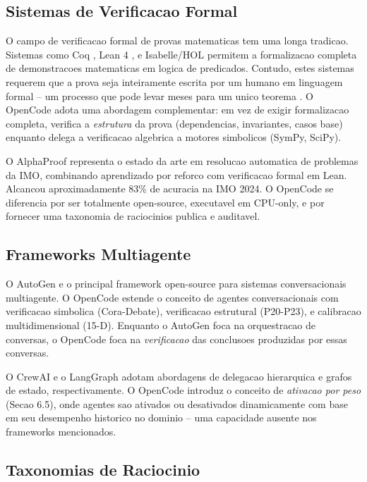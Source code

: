 \documentclass[5p]{elsarticle}
\begin{document}
\subsection{Sistemas de Verificacao Formal}

O campo de verificacao formal de provas matematicas tem uma longa tradicao.
Sistemas como Coq \cite{bertot2004}, Lean 4 \cite{demoura2021}, e Isabelle/HOL
permitem a formalizacao completa de demonstracoes matematicas em logica de
predicados. Contudo, estes sistemas requerem que a prova seja inteiramente
escrita por um humano em linguagem formal -- um processo que pode levar meses
para um unico teorema \cite{bertot2004}. O OpenCode adota uma abordagem
complementar: em vez de exigir formalizacao completa, verifica a \textit{estrutura}
da prova (dependencias, invariantes, casos base) enquanto delega a verificacao
algebrica a motores simbolicos (SymPy, SciPy).

O AlphaProof \cite{deepmind2025} representa o estado da arte em resolucao
automatica de problemas da IMO, combinando aprendizado por reforco com
verificacao formal em Lean. Alcancou aproximadamente 83\% de acuracia na
IMO 2024. O OpenCode se diferencia por ser totalmente open-source, executavel
em CPU-only, e por fornecer uma taxonomia de raciocinios publica e auditavel.

\subsection{Frameworks Multiagente}

O AutoGen \cite{wu2023} e o principal framework open-source para sistemas
conversacionais multiagente. O OpenCode estende o conceito de agentes
conversacionais com verificacao simbolica (Cora-Debate), verificacao estrutural
(P20-P23), e calibracao multidimensional (15-D). Enquanto o AutoGen foca na
orquestracao de conversas, o OpenCode foca na \textit{verificacao} das
conclusoes produzidas por essas conversas.

O CrewAI e o LangGraph adotam abordagens de delegacao hierarquica e grafos
de estado, respectivamente. O OpenCode introduz o conceito de \textit{ativacao
por peso} (Secao 6.5), onde agentes sao ativados ou desativados dinamicamente
com base em seu desempenho historico no dominio -- uma capacidade ausente nos
frameworks mencionados.

\subsection{Taxonomias de Raciocinio}
\end{document}
